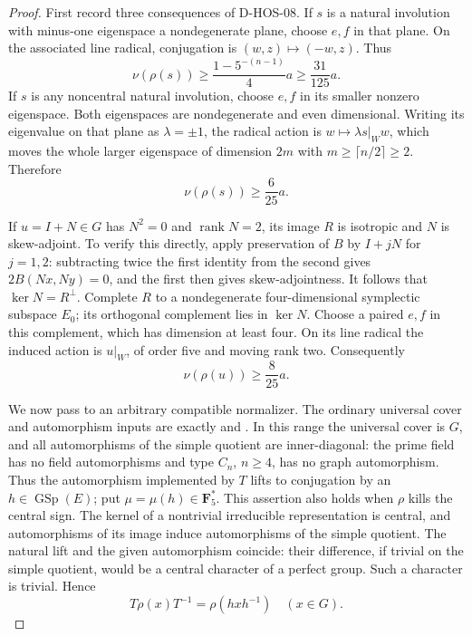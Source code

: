 \begin{proof}
First record three consequences of D-HOS-08. If $s$ is a natural
involution with minus-one eigenspace a nondegenerate plane, choose
$e,f$ in that plane. On the associated line radical, conjugation is
$(w,z)\mapsto(-w,z)$. Thus
\[
 \nu(\rho(s))\ge\frac{1-5^{-(n-1)}}4a
                          \ge\frac{31}{125}a.               \tag{HOS5.12}
\]
If $s$ is any noncentral natural involution, choose $e,f$ in its
smaller nonzero eigenspace. Both eigenspaces are nondegenerate and
even dimensional. Writing its eigenvalue on that plane as
$\lambda=\pm1$, the radical action is $w\mapsto\lambda s|_Ww$,
which moves the whole larger eigenspace of dimension $2m$ with
$m\ge\lceil n/2\rceil\ge2$. Therefore
\[
                         \nu(\rho(s))\ge\frac6{25}a.        \tag{HOS5.13}
\]

If $u=I+N\in G$ has $N^2=0$ and $\operatorname{rank}N=2$, its
image $R$ is isotropic and $N$ is skew-adjoint. To verify this
directly, apply preservation of $B$ by $I+jN$ for $j=1,2$:
subtracting twice the first identity from the second gives
$2B(Nx,Ny)=0$, and the first then gives skew-adjointness.
It follows that $\ker N=R^\perp$. Complete $R$ to a nondegenerate
four-dimensional symplectic subspace $E_0$; its orthogonal
complement lies in $\ker N$. Choose a paired $e,f$ in this
complement, which has dimension at least four. On its line radical
the induced action is $u|_W$, of order five and moving rank two.
Consequently
\[
                         \nu(\rho(u))\ge\frac8{25}a.        \tag{HOS5.14}
\]

We now pass to an arbitrary compatible normalizer. The ordinary
universal cover and automorphism inputs are exactly
\cite[Chapter~5, Table~1, p.~35]{BI:HHM} and
\cite[\S2.2.2, Table~2.1, author p.~14]{HES:LiXia2022}.
In this range the universal cover is $G$, and all automorphisms of
the simple quotient are inner-diagonal: the prime field has no
field automorphisms and type $C_n$, $n\ge4$, has no graph
automorphism. Thus the automorphism implemented by $T$ lifts to
conjugation by an $h\in\operatorname{GSp}(E)$; put
$\mu=\mu(h)\in\mathbf F_5^*$.
This assertion also holds when $\rho$ kills the central sign.
The kernel of a nontrivial irreducible representation is central,
and automorphisms of its image induce automorphisms of the simple
quotient. The natural lift and the given automorphism coincide:
their difference, if trivial on the simple quotient, would be a
central character of a perfect group. Such a character is trivial.
Hence
\[
                     T\rho(x)T^{-1}=\rho(hxh^{-1})
                            \quad(x\in G).                  \tag{HOS5.15}
\]


\end{proof}
